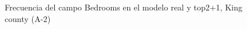 \begin{figure}[H]
    \centering
    
    \caption{Frecuencia del campo Bedrooms en el modelo real y top2+1, King county (A-2)}
    \label{frecuency-top2+1-bedrooms}
\end{figure}